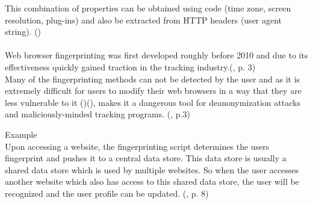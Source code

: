 This combination of properties can be obtained using code (time zone, screen resolution, plug-ins) and also be extracted from HTTP headers (user agent string). (\textcite{miele18}) \\\\
Web browser fingerprinting was first developed roughly before 2010 and due to its effectiveness quickly gained traction in the tracking industry.(\textcite{havens16}, p. 3) \\
Many of the fingerprinting methods can not be detected by the user and as it is extremely difficult for users to modify their web browsers in a way that they are less vulnerable to it (\textcite{amiunique})(\textcite{miele18}), makes it a dangerous tool for deanonymization attacks and maliciously-minded tracking programs. (\textcite{havens16}, p.3)\\
\begin{tcolorbox}
Example\\
Upon accessing a website, the fingerprinting script determines the users fingerprint and pushes it to a central data store. This data store is usually a shared data store which is used by multiple websites. So when the user accesses another website which also has access to this shared data store, the user will be recognized and the user profile can be updated. (\textcite{havens16}, p. 8)
\end{tcolorbox}

